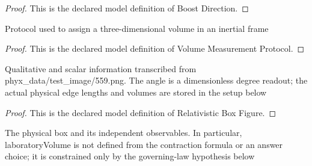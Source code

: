 \begin{proof}
  This is the declared model definition of Boost Direction.
\end{proof}
\begin{definition}
  \label{def:physics:phyx-mini-0559:phyxminiproblems-problemphyxmini0559-volumemeasurementprotocol}
  Protocol used to assign a three-dimensional volume in an inertial frame
\end{definition}
\begin{proof}
  This is the declared model definition of Volume Measurement Protocol.
\end{proof}
\begin{definition}
  \label{def:physics:phyx-mini-0559:phyxminiproblems-problemphyxmini0559-relativisticboxfigure}
  Qualitative and scalar information transcribed from phyx\_data/test\_image/559.png. The angle is a dimensionless degree readout; the actual physical edge lengths and volumes are stored in the setup below
\end{definition}
\begin{proof}
  This is the declared model definition of Relativistic Box Figure.
\end{proof}
\begin{definition}
  \label{def:physics:phyx-mini-0559:phyxminiproblems-problemphyxmini0559-relativisticrectangularboxsetup}
  The physical box and its independent observables. In particular, laboratoryVolume is not defined from the contraction formula or an answer choice; it is constrained only by the governing-law hypothesis below
\end{definition}
